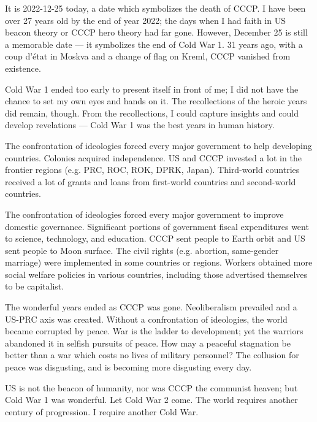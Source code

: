 
\begin{multicols*}{2}
    
It is 2022-12-25 today, a date which symbolizes the death of CCCP.
I have been over 27 years old by the end of year 2022;
the days when I had faith in US beacon theory or CCCP hero theory had far gone.
However, December 25 is still a memorable date --- it symbolizes the end of Cold War 1.
31 years ago, with a coup d'\'etat in Moskva and a change of flag on Kreml, CCCP vanished from existence.

Cold War 1 ended too early to present itself in front of me;
I did not have the chance to set my own eyes and hands on it.
The recollections of the heroic years did remain, though.
From the recollections, I could capture insights and could develop revelations ---
Cold War 1 was the best years in human history.

The confrontation of ideologies forced every major government to help developing countries.
Colonies acquired independence.
US and CCCP invested a lot in the frontier regions (e.g. PRC, ROC, ROK, DPRK, Japan).
Third-world countries received a lot of grants and loans from first-world countries and second-world countries.

The confrontation of ideologies forced every major government to improve domestic governance.
Significant portions of government fiscal expenditures went to science, technology, and education.
CCCP sent people to Earth orbit and US sent people to Moon surface.
The civil rights (e.g. abortion, same-gender marriage) were implemented in some countries or regions.
Workers obtained more social welfare policies in various countries, including those advertised themselves to be capitalist.

The wonderful years ended as CCCP was gone.
Neoliberalism prevailed and a US-PRC axis was created.
Without a confrontation of ideologies, the world became corrupted by peace.
War is the ladder to development; yet the warriors abandoned it in selfish pursuits of peace.
How may a peaceful stagnation be better than a war which costs no lives of military personnel?
The collusion for peace was disgusting, and is becoming more disgusting every day.

US is not the beacon of humanity, nor was CCCP the communist heaven; but Cold War 1 was wonderful.
Let Cold War 2 come.
The world requires another century of progression.
I require another Cold War.


\end{multicols*}
